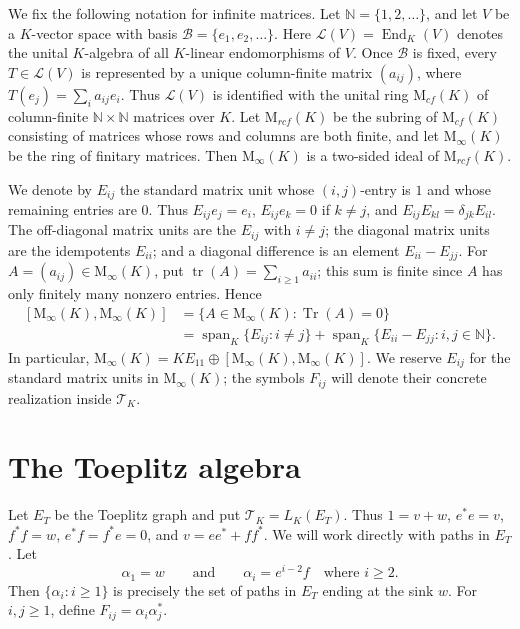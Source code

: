 \documentclass[11pt]{article}
\numberwithin{equation}{section}
\theoremstyle{plain}
\theoremstyle{definition}
\numberwithin{equation}{section}
\newcommand{\T}{\mathscr T_K}
\begin{document}
We fix the following notation for infinite matrices. Let $\mathbb N=\{1,2,\ldots\}$, and let $V$ be a $K$-vector space with basis $\mathscr B=\{e_1,e_2,\ldots\}$. Here $\mathcal L(V)=\operatorname{End}_K(V)$ denotes the unital $K$-algebra of all $K$-linear endomorphisms of $V$. Once $\mathscr B$ is fixed, every $T\in\mathcal L(V)$ is represented by a unique column-finite matrix $(a_{ij})$, where $T(e_j)=\sum_i a_{ij}e_i$. Thus $\mathcal L(V)$ is identified with the unital ring $\mathrm M_{cf}(K)$ of column-finite $\mathbb N\times\mathbb N$ matrices over $K$. Let $\mathrm M_{rcf}(K)$ be the subring of $\mathrm M_{cf}(K)$ consisting of matrices whose rows and columns are both finite, and let $\mathrm M_\infty(K)$ be the ring of finitary matrices. Then $\mathrm M_\infty(K)$ is a two-sided ideal of $\mathrm M_{rcf}(K)$.

We denote by $E_{ij}$ the standard matrix unit whose $(i,j)$-entry is $1$ and whose remaining entries are $0$. Thus $E_{ij}e_j=e_i$, $E_{ij}e_k=0$ if $k\neq j$, and $E_{ij}E_{kl}=\delta_{jk}E_{il}$. The off-diagonal matrix units are the $E_{ij}$ with $i\neq j$; the diagonal matrix units are the idempotents $E_{ii}$; and a diagonal difference is an element $E_{ii}-E_{jj}$. For $A=(a_{ij})\in\mathrm M_\infty(K)$, put $\operatorname{tr}(A)=\sum_{i\geq 1}a_{ii}$; this sum is finite since $A$ has only finitely many nonzero entries. Hence
$$
\begin{aligned}
[\mathrm M_\infty(K),\mathrm M_\infty(K)]
&=\{A\in\mathrm M_\infty(K):\operatorname{Tr}(A)=0\}\\
&=\operatorname{span}_K\{E_{ij}:i\neq j\}
+\operatorname{span}_K\{E_{ii}-E_{jj}:i,j\in\mathbb N\}.
\end{aligned}
$$
In particular, $\mathrm M_\infty(K)=KE_{11}\oplus[\mathrm M_\infty(K),\mathrm M_\infty(K)]$. We reserve $E_{ij}$ for the standard matrix units in $\mathrm M_\infty(K)$; the symbols $F_{ij}$ will denote their concrete realization inside $\T$.



\section{The Toeplitz algebra}

Let $E_T$ be the Toeplitz graph and put $\T=L_K(E_T)$. Thus $1=v+w$, $e^*e=v$, $f^*f=w$, $e^*f=f^*e=0$, and $v=ee^*+ff^*$. We will work directly with paths in $E_T$. Let
$$
        \alpha_1=w\qquad\text{and}\qquad \alpha_i=e^{i-2}f\quad\text{where }i\geq2.
$$
Then $\{\alpha_i:i\geq1\}$ is precisely the set of paths in $E_T$ ending at the sink $w$. For $i,j\geq1$, define $F_{ij}=\alpha_i\alpha_j^*$.
\end{document}

